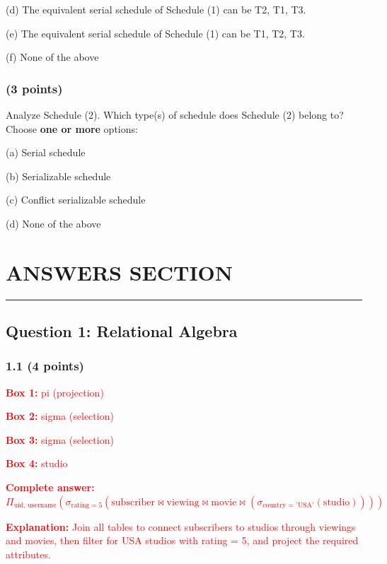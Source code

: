 \documentclass[11pt,a4paper]{article}
\begin{document}
(d) The equivalent serial schedule of Schedule (1) can be T2, T1, T3.

(e) The equivalent serial schedule of Schedule (1) can be T1, T2, T3.

(f) None of the above

\subsubsection{(3 points)}
Analyze Schedule (2). Which type(s) of schedule does Schedule (2) belong to? Choose \textbf{one or more} options:

(a) Serial schedule

(b) Serializable schedule

(c) Conflict serializable schedule

(d) None of the above

\newpage
\newpage


\section*{ANSWERS SECTION}

\hrule
\vspace{1em}

\subsection*{Question 1: Relational Algebra}

\subsubsection*{1.1 (4 points)}
\textcolor{red}{\textbf{Box 1:} pi (projection)}

\textcolor{red}{\textbf{Box 2:} sigma (selection)}

\textcolor{red}{\textbf{Box 3:} sigma (selection)}

\textcolor{red}{\textbf{Box 4:} studio}

\textcolor{red}{\textbf{Complete answer:} $\Pi_{\text{uid, username}}(\sigma_{\text{rating} = 5}(\text{subscriber} \bowtie \text{viewing} \bowtie \text{movie} \bowtie (\sigma_{\text{country = 'USA'}}(\text{studio}))))$}

\textcolor{red}{\textbf{Explanation:} Join all tables to connect subscribers to studios through viewings and movies, then filter for USA studios with rating = 5, and project the required attributes.}
\end{document}

